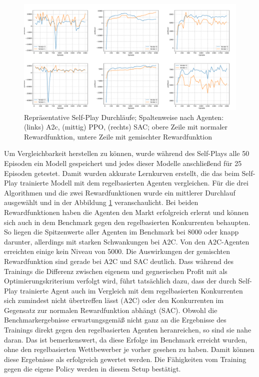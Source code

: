 \begin{figure}[htbp]
	\centering
	\includegraphics[width=\textwidth]{main/self_play_detailed.pdf}
	\caption{Repräsentative Self-Play Durchläufe; Spaltenweise nach Agenten: (links) A2c, (mittig) PPO, (rechts) SAC; obere Zeile mit normaler Rewardfunktion, untere Zeile mit gemischter Rewardfunktion}
	\label{graphic:SelfPlayDetails}
\end{figure}
Um Vergleichbarkeit herstellen zu können, wurde während des Self-Plays alle 50 Episoden ein Modell gespeichert und jedes dieser Modelle anschließend für 25 Episoden getestet.
Damit wurden akkurate Lernkurven erstellt, die das beim Self-Play trainierte Modell mit dem regelbasierten Agenten vergleichen.
Für die drei Algorithmen und die zwei Rewardfunktionen wurde ein mittlerer Durchlauf ausgewählt und in der Abbildung \ref{graphic:SelfPlayDetails} veranschaulicht.
Bei beiden Rewardfunktionen haben die Agenten den Markt erfolgreich erlernt und können sich auch in dem Benchmark gegen den regelbasierten Konkurrenten behaupten.
So liegen die Spitzenwerte aller Agenten im Benchmark bei 8000 oder knapp darunter, allerdings mit starken Schwankungen bei A2C.
Von den A2C-Agenten erreichten einige kein Niveau von 5000.
Die Auswirkungen der gemischten Rewardfunktion sind gerade bei A2C und SAC deutlich.
Dass während des Trainings die Differenz zwischen eigenem und gegnerischen Profit mit als Optimierungskriterium verfolgt wird, führt tatsächlich dazu, dass der durch Self-Play trainierte Agent auch im Vergleich mit dem regelbasierten Konkurrenten sich zumindest nicht übertreffen lässt (A2C) oder den Konkurrenten im Gegensatz zur normalen Rewardfunktion abhängt (SAC).
Obwohl die Benchmarkergebnisse erwartungsgemäß nicht ganz an die Ergebnisse des Trainings direkt gegen den regelbasierten Agenten heranreichen, so sind sie nahe daran.
Das ist bemerkenswert, da diese Erfolge im Benchmark erreicht wurden, ohne den regelbasierten Wettbewerber je vorher gesehen zu haben.
Damit können diese Ergebnisse als erfolgreich gewertet werden.
Die Fähigkeiten vom Training gegen die eigene Policy werden in diesem Setup bestätigt.

